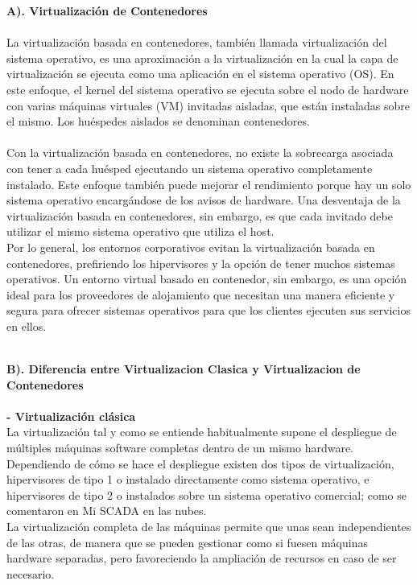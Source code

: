 \documentclass[twoside,twocolumn]{article}
\begin{document}
\begin{flushright}
\begin{itemize}
 \textbf{A). Virtualización de Contenedores }\\
\textbf{}\\
La virtualización basada en contenedores, también llamada virtualización del sistema operativo, es una aproximación a la virtualización en la cual la capa de virtualización se ejecuta como una aplicación en el sistema operativo (OS). En este enfoque, el kernel del sistema operativo se ejecuta sobre el nodo de hardware con varias máquinas virtuales (VM) invitadas aisladas, que están instaladas sobre el mismo. Los huéspedes aislados se denominan contenedores.\textbf{}\\
\textbf{}\\
Con la virtualización basada en contenedores, no existe la sobrecarga asociada con tener a cada huésped ejecutando un sistema operativo completamente instalado. Este enfoque también puede mejorar el rendimiento porque hay un solo sistema operativo encargándose de los avisos de hardware. Una desventaja de la virtualización basada en contenedores, sin embargo, es que cada invitado debe utilizar el mismo sistema operativo que utiliza el host.
\textbf{}\\
Por lo general, los entornos corporativos evitan la virtualización basada en contenedores, prefiriendo los hipervisores y la opción de tener muchos sistemas operativos. Un entorno virtual basado en contenedor, sin embargo, es una opción ideal para los proveedores de alojamiento que necesitan una manera eficiente y segura para ofrecer sistemas operativos para que los clientes ejecuten sus servicios en ellos.

\textbf{}\\
 \textbf{B). Diferencia entre Virtualizacion Clasica y Virtualizacion de Contenedores}\\

\textbf{}\\
\textbf{- Virtualización clásica}\\
La virtualización tal y como se entiende habitualmente supone el despliegue de múltiples máquinas software completas dentro de un mismo hardware. Dependiendo de cómo se hace el despliegue existen dos tipos de virtualización, hipervisores de tipo 1 o instalado directamente como sistema operativo, e hipervisores de tipo 2 o instalados sobre un sistema operativo comercial; como se comentaron en Mi SCADA en las nubes.\textbf{}\\
La virtualización completa de las máquinas permite que unas sean independientes de las otras, de manera que se pueden gestionar como si fuesen máquinas hardware separadas, pero favoreciendo la ampliación de recursos en caso de ser necesario.
\textbf{}\\


\end{itemize}
\end{flushright}
\end{document}
